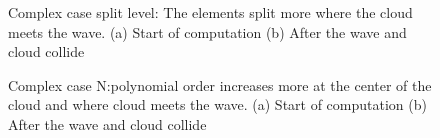 \begin{figure}[H]
	\centering
	\hfill
	\caption{Complex case split level: The elements split more where the cloud meets the wave. (a) Start of computation (b) After the wave and cloud collide}\label{fig:cloud_s}
\end{figure}

\begin{figure}[H]
	\centering
	\hfill
	\caption{Complex case N:\@The polynomial order increases more at the center of the cloud and where cloud meets the wave. (a) Start of computation (b) After the wave and cloud collide}\label{fig:cloud_N}
\end{figure}

